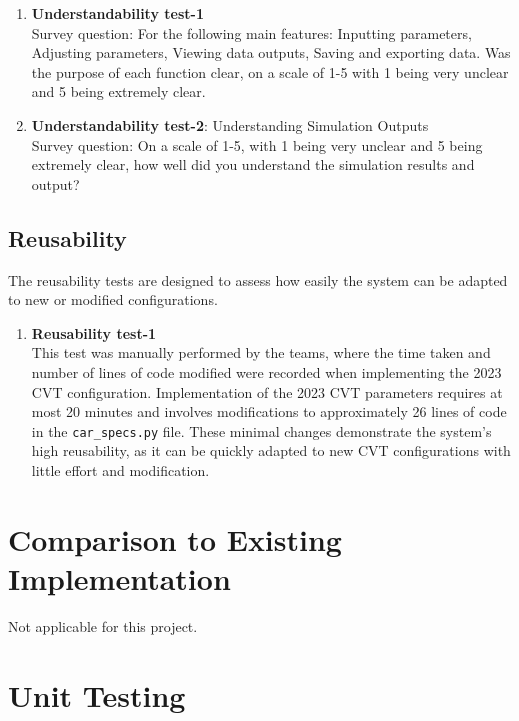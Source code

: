 \documentclass[12pt, titlepage]{article}
\begin{document}
\begin{enumerate}
  \item{\textbf{Understandability test-1}}\\
  Survey question: For the following main features: Inputting parameters, Adjusting parameters, Viewing data outputs, Saving and exporting data. 
  Was the purpose of each function clear, on a scale of 1-5 with 1 being very unclear and 5 being extremely clear. 
  \item{\textbf{Understandability test-2}: Understanding Simulation Outputs}\\
  Survey question: On a scale of 1-5, with 1 being very unclear and 5 being extremely clear, how well did you understand the simulation results and output?
\end{enumerate}

\subsection{Reusability}

The reusability tests are designed to assess how easily the system can be adapted to new or modified configurations. 
\begin{enumerate}
    \item {\textbf{Reusability test-1}}\\
    This test was manually performed by the teams, where the time taken and number of lines of code modified were recorded when implementing the 2023 CVT configuration. 
    Implementation of the 2023 CVT parameters requires at most 20 minutes and involves modifications to approximately 26 lines of code in the \texttt{car\_specs.py} file. 
    These minimal changes demonstrate the system's high reusability, as it can be quickly adapted to new CVT configurations with little effort and modification.
\end{enumerate}
	
\section{Comparison to Existing Implementation}	

Not applicable for this project.
\section{Unit Testing}
\end{document}
